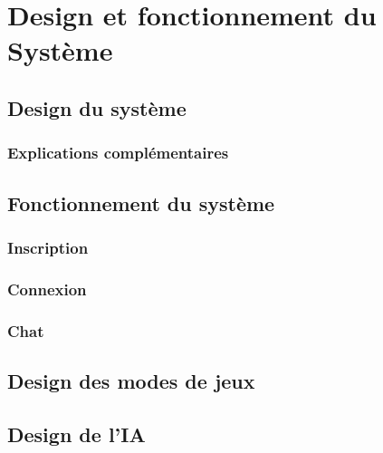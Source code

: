 \documentclass[utf8]{article}
\begin{document}
\section{Design et fonctionnement du Système}
  \subsection{Design du système}
    \subsubsection{Explications complémentaires}
  \subsection{Fonctionnement du système}
    \subsubsection{Inscription}
    \subsubsection{Connexion}
    \subsubsection{Chat}
  \subsection{Design des modes de jeux}
  \subsection{Design de l'IA}





\end{document}
